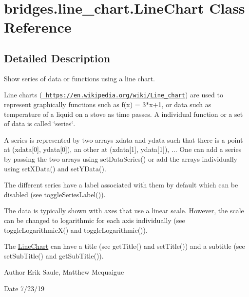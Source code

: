 \hypertarget{classbridges_1_1line__chart_1_1_line_chart}{}\section{bridges.\+line\+\_\+chart.\+Line\+Chart Class Reference}
\label{classbridges_1_1line__chart_1_1_line_chart}


\subsection{Detailed Description}
Show series of data or functions using a line chart. 

Line charts (\href{https://en.wikipedia.org/wiki/Line_chart}{\texttt{ https\+://en.\+wikipedia.\+org/wiki/\+Line\+\_\+chart}}) are used to represent graphically functions such as f(x) = 3$\ast$x+1, or data such as temperature of a liquid on a stove as time passes. A individual function or a set of data is called \char`\"{}series\char`\"{}.

A series is represented by two arrays xdata and ydata such that there is a point at (xdata\mbox{[}0\mbox{]}, ydata\mbox{[}0\mbox{]}), an other at (xdata\mbox{[}1\mbox{]}, ydata\mbox{[}1\mbox{]}), ... One can add a series by passing the two arrays using set\+Data\+Series() or add the arrays individually using set\+X\+Data() and set\+Y\+Data().

The different series have a label associated with them by default which can be disabled (see toggle\+Series\+Label()).

The data is typically shown with axes that use a linear scale. However, the scale can be changed to logarithmic for each axis individually (see toggle\+Logarithmic\+X() and toggle\+Logarithmic()).

The \mbox{\hyperlink{classbridges_1_1line__chart_1_1_line_chart}{Line\+Chart}} can have a title (see get\+Title() and set\+Title()) and a subtitle (see set\+Sub\+Title() and get\+Sub\+Title()).

\begin{DoxyAuthor}{Author}
Erik Saule, Matthew Mcquaigue
\end{DoxyAuthor}
\begin{DoxyDate}{Date}
7/23/19 
\end{DoxyDate}
